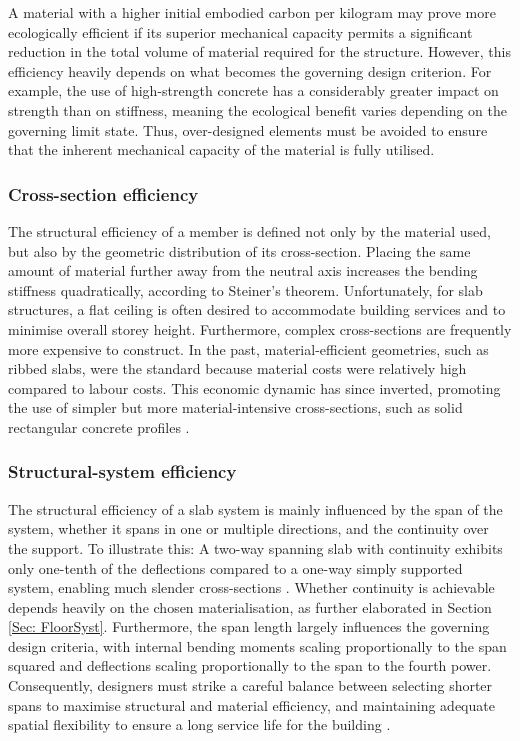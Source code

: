 A material with a higher initial embodied carbon per kilogram may prove more ecologically efficient if its superior mechanical capacity permits a significant reduction in the total volume of material required for the structure. However, this efficiency heavily depends on what becomes the governing design criterion. For example, the use of high-strength concrete has a considerably greater impact on strength than on stiffness, meaning the ecological benefit varies depending on the governing limit state.  Thus, over-designed elements must be avoided to ensure that the inherent mechanical capacity of the material is fully utilised.

\subsubsection{Cross-section efficiency}
The structural efficiency of a member is defined not only by the material used, but also by the geometric distribution of its cross-section. Placing the same amount of material further away from the neutral axis increases the bending stiffness quadratically, according to Steiner’s theorem. Unfortunately, for slab structures, a flat ceiling is often desired to accommodate building services and to minimise overall storey height. Furthermore, complex cross-sections are frequently more expensive to construct. In the past, material-efficient geometries, such as ribbed slabs, were the standard because material costs were relatively high compared to labour costs. This economic dynamic has since inverted, promoting the use of simpler but more material-intensive cross-sections, such as solid rectangular concrete profiles \cite{Kaufmann2024_WhitePaper}.

\subsubsection{Structural-system efficiency}
The structural efficiency of a slab system is mainly influenced by the span of the system, whether it spans in one or multiple directions, and the continuity over the support. To illustrate this: A two-way spanning slab with continuity exhibits only one-tenth of the deflections compared to a one-way simply supported system, enabling much slender cross-sections \cite{Kaufmann2024_WhitePaper}. Whether continuity is achievable depends heavily on the chosen materialisation, as further elaborated in Section \ref{Sec: FloorSyst}. Furthermore, the span length largely influences the governing design criteria, with internal bending moments scaling proportionally to the span squared and deflections scaling proportionally to the span to the fourth power. Consequently, designers must strike a careful balance between selecting shorter spans to maximise structural and material efficiency, and maintaining adequate spatial flexibility to ensure a long service life for the building \cite{Kaufmann2024_WhitePaper}.


